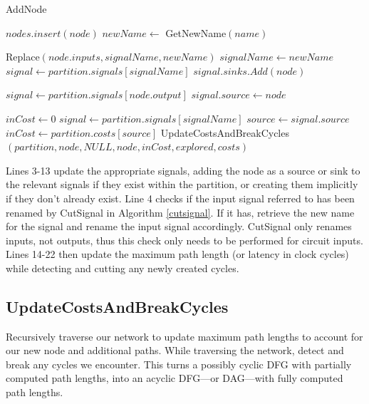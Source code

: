 \documentclass[12pt,final,oneside]{dwThesis} %
\begin{document}
\begin{algorithm}
\begin{center}
      \end{center}

      \caption{AddNode}\label{addnode} 
      \begin{algorithmic}[1]
         \State $nodes.insert(node)$
           
         \State
         $newName \gets$ GetNewName$(name)$ 

         \State Replace$(node.inputs, signalName, newName)$  
         \State $signalName
         \gets newName$ \EndIf 
         \State $signal \gets
         partition.signals[signalName]$ 
         \State $signal.sinks.Add(node)$ \EndFor

         \State $signal \gets partition.signals[node.output]$ 
         \State
         $signal.source \gets node$


         \State $inCost \gets 0$  
         \State
         $signal \gets partition.signals[signalName]$ 
         \State $source \gets
         signal.source$  
         \State $inCost
         \gets partition.costs[source]$ \EndIf \EndFor 
         \State
         UpdateCostsAndBreakCycles$(partition, node, NULL, node, inCost,
         explored, costs)$ \EndProcedure 
      \end{algorithmic}

   \end{algorithm}

   Lines 3-13 update the appropriate signals, adding the node as a source or
   sink to the relevant signals if they exist within the partition, or creating them implicitly if they don't already exist.
   Line 4 checks if the input signal referred to has been renamed by CutSignal in Algorithm \ref{cutsignal}.
   If it has, retrieve the new name for the signal and rename the input signal accordingly.
   CutSignal only renames inputs, not outputs, thus this check only needs to be performed for circuit inputs.
   Lines 14-22 then update the maximum path length (or latency in
   clock cycles) while detecting and cutting any newly created cycles.


   \newpage 
   \subsection{UpdateCostsAndBreakCycles}
   Recursively traverse our
   network to update maximum path lengths to account for our new node and
   additional paths. While traversing the network, detect and break any cycles
   we encounter.  This turns a possibly cyclic \gls{DFG} with partially
   computed path lengths, into an acyclic \gls{DFG}---or \gls{DAG}---with fully computed path
   lengths.
\end{document}
